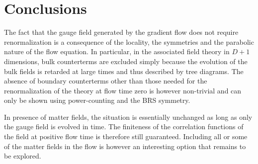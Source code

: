 \section{Conclusions}\label{sec:conclusions}

The fact that the gauge field generated by the gradient flow
does not require renormalization is a consequence of the
locality, the symmetries and the parabolic nature
of the flow equation.
In particular, in the
associated field theory in $D+1$ dimensions,
bulk counterterms are excluded simply
because the evolution of the bulk fields is retarded at large times
and thus described by tree diagrams.
The absence of
boundary counterterms other than those needed for the renormalization of
the theory at flow time zero is however
non-trivial and can only be shown
using power-counting and the BRS symmetry.

In presence of matter fields, the situation is essentially
unchanged as long as only the gauge field is evolved in time.
The finiteness of the correlation functions of the field at positive
flow time is therefore still guaranteed.
Including all or some of the matter fields in the flow is however
an interesting option that remains to be explored.
